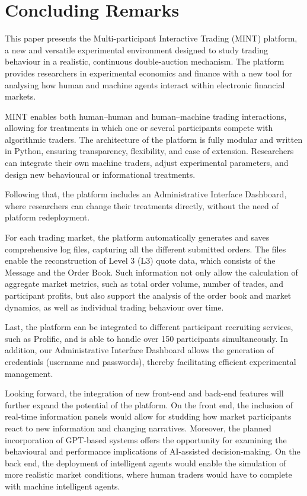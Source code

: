 \section{Concluding Remarks}
This paper presents the Multi-participant Interactive Trading (MINT) platform, a new and versatile experimental environment designed to study trading behaviour in a realistic, continuous double-auction mechanism. The platform provides researchers in experimental economics and finance with a new tool for analysing how human and machine agents interact within electronic financial markets.

MINT enables both human–human and human–machine trading interactions, allowing for treatments in which one or several participants compete with algorithmic traders. The architecture of the platform is fully modular and written in Python, ensuring transparency, flexibility, and ease of extension. Researchers can integrate their own machine traders, adjust experimental parameters, and design new behavioural or informational treatments.

Following that, the platform includes an Administrative Interface Dashboard, where researchers can change their treatments directly, without the need of platform redeployment.

For each trading market, the platform automatically generates and saves comprehensive log files, capturing all the different submitted orders. The files enable the reconstruction of Level 3 (L3) quote data, which consists of the Message and the Order Book. Such information not only allow the calculation of aggregate market metrics, such as total order volume, number of trades, and participant profits, but also support the analysis of the order book and market dynamics, as well as individual trading behaviour over time. 

Last, the platform can be integrated to different participant recruiting services, such as Prolific, and is able to handle over 150 participants simultaneously. In addition, our Administrative Interface Dashboard allows the generation of credentials (username and passwords), thereby facilitating efficient experimental management.


Looking forward, the integration of new front-end and back-end features will further expand the  potential of the platform. On the front end, the inclusion of real-time information panels would allow for   studding  how market participants react to new information and changing narratives. Moreover, the planned incorporation of GPT-based systems offers the opportunity for examining the behavioural and performance implications of AI-assisted decision-making. On the back end, the deployment of intelligent agents would enable the simulation of more realistic market conditions, where human traders would have to complete with machine intelligent agents. 